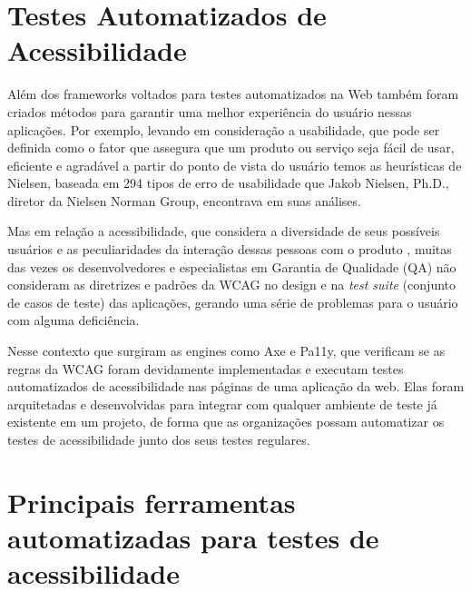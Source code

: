 \documentclass[
	12pt,				%
	openright,			%
	oneside,			%
	a4paper,			%
	chapter=TITLE,		%
	section=TITLE,		%
	subsection=TITLE,	%
	subsubsection=TITLE,%
	english,			%
	brazil				%
	]{abntex2}
\theoremstyle{definition}
\begin{document}
\section{Testes Automatizados de Acessibilidade}

Além dos frameworks voltados para testes automatizados na Web  também foram criados métodos para garantir uma melhor experiência do usuário nessas aplicações. Por exemplo, levando em consideração a usabilidade, que pode ser definida como o fator que assegura que um produto ou serviço seja fácil de usar, eficiente e agradável a partir do ponto de vista do usuário \cite{sharp2005design} temos as heurísticas de Nielsen, baseada em 294 tipos de erro de usabilidade que Jakob Nielsen, Ph.D., diretor da Nielsen Norman Group, encontrava em suas análises.

Mas em relação a acessibilidade, que considera a diversidade de seus possíveis usuários e as peculiaridades da interação dessas pessoas com o produto \cite{torres2004conteudos}, muitas das vezes os desenvolvedores e especialistas em Garantia de Qualidade (QA) não consideram as diretrizes e padrões da WCAG no design e na \textit{test suite} (conjunto de casos de teste) das aplicações, gerando uma série de problemas para o usuário com alguma deficiência.

Nesse contexto que surgiram as engines como Axe e Pa11y, que verificam se as regras da WCAG foram devidamente implementadas e executam testes automatizados de acessibilidade nas páginas de uma aplicação da web. Elas foram arquitetadas e desenvolvidas para integrar com qualquer ambiente de teste já existente em um projeto, de forma que as organizações possam automatizar os testes de acessibilidade junto dos seus testes regulares.

\section{Principais ferramentas automatizadas para testes de acessibilidade}

\end{document}
